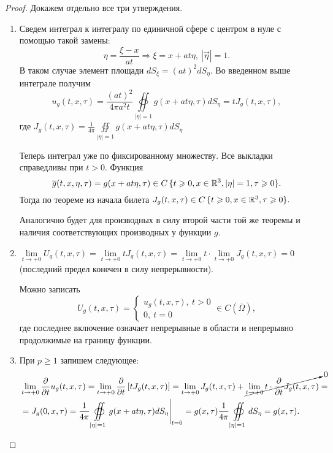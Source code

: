 \documentclass[../main.tex]{subfiles}
\begin{document}
\begin{proof} Докажем отдельно все три утверждения.
\begin{enumerate}
\item Сведем интеграл к интегралу по единичной сфере с центром в нуле с помощью такой замены:
\[
\eta = \frac{\xi - x}{at}\Rightarrow \xi = x+at\eta ,\ |\vec{\eta} |=1.
\]
В таком случае элемент площади $dS_{\xi}=(at)^2dS_{\eta}$. Во введенном выше интеграле получим 
\[
u_g(t,x,\tau)=\frac{(at)^2}{4\pi a^2t}\oiint\limits_{|\eta |=1}g(x+at\eta ,\tau ) dS_{\eta}=tJ_g(t,x,\tau ),
\]
где $\displaystyle J_g(t,x,\tau )= \frac{1}{4\pi}\oiint\limits_{|\eta |=1}g(x+at\eta ,\tau ) dS_{\eta}$

Теперь интеграл уже по фиксированному множеству. Все выкладки справедливы при $t>0$. Функция
\[
\overline{g}(t,x,\eta ,\tau)=g(x+at\eta, \tau)\in C\,\{t\geqslant 0, x\in \mathbb{R}^3 , |\eta | = 1, \tau\geqslant 0\}.
\]
Тогда по теореме из начала билета $J_g(t,x,\tau )\in C\,\{t\geqslant 0, x\in \mathbb{R}^3,\tau\geqslant 0\}.$

Аналогично будет для производных в силу второй части той же теоремы и наличия соответствующих производных у функции $g$.

\item $\lim\limits_{t\rightarrow +0}U_g(t,x,\tau )=\lim\limits_{t\rightarrow +0}tJ_g(t,x,\tau )=\lim\limits_{t\rightarrow +0}t\cdot\lim\limits_{t\rightarrow +0}J_g(t,x,\tau ) = 0$ (последний предел конечен в силу непрерывности).

Можно записать
\[
U_g(t,x,\tau ) = \begin{cases}
u_g(t,x, \tau ),\ t>0\\
0,\ t=0
\end{cases} \in C\left(\overline{\Omega} \right),
\]
где последнее включение означает непрерывные в области и непрерывно продолжимые на границу функции.

\item При $p\geq 1$ запишем следующее:
\begin{equation*}
\begin{split}
&\lim\limits_{t\rightarrow +0}\frac{\partial}{\partial t} u_g(t,x, \tau) = \lim\limits_{t\rightarrow +0}\frac{\partial}{\partial t}\left[tJ_g(t,x,\tau )\right]=\lim\limits_{t\rightarrow +0}J_g(t,x,\tau )+\cancelto{0}{\lim\limits_{t\rightarrow +0}t\cdot \frac{\partial}{\partial t}J_g(t,x,\tau )}=\\
&=J_g(0, x, \tau )=\frac{1}{4\pi}\oiint\limits_{|\eta |=1}g(x+at\eta ,\tau )dS_{\eta }\Biggr|_{t=0}=g(x, \tau )\frac{1}{4\pi}\oiint\limits_{|\eta |=1}dS_{\eta}=g(x,\tau ).
\end{split}
\end{equation*}
\end{enumerate}
\end{proof}
\end{document}
